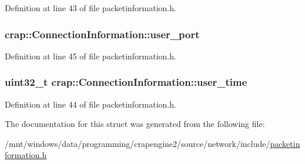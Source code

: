 Definition at line 43 of file packetinformation.\+h.

\hypertarget{structcrap_1_1_connection_information_a48470bcb4879d69d481d3c7f00e66daa}{}
\subsubsection[{user\+\_\+port}]{ crap\+::\+Connection\+Information\+::user\+\_\+port}\label{structcrap_1_1_connection_information_a48470bcb4879d69d481d3c7f00e66daa}


Definition at line 45 of file packetinformation.\+h.

\hypertarget{structcrap_1_1_connection_information_af361c0986431eeec02ea4149de72496c}{}
\subsubsection[{user\+\_\+time}]{\setlength{\rightskip}{0pt plus 5cm}uint32\+\_\+t crap\+::\+Connection\+Information\+::user\+\_\+time}\label{structcrap_1_1_connection_information_af361c0986431eeec02ea4149de72496c}


Definition at line 44 of file packetinformation.\+h.



The documentation for this struct was generated from the following file\+:\begin{DoxyCompactItemize}
\item 
/mnt/windows/data/programming/crapengine2/source/network/include/\hyperlink{packetinformation_8h}{packetinformation.\+h}\end{DoxyCompactItemize}
